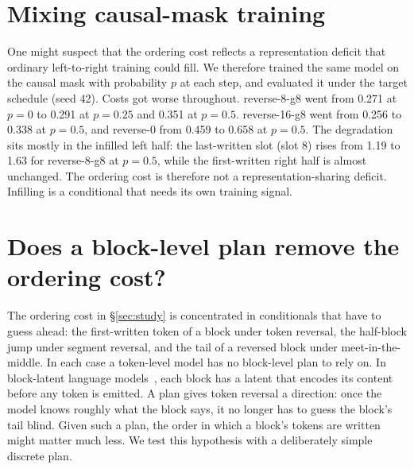 \documentclass[11pt]{article}
\theoremstyle{definition}
\theoremstyle{remark}
\newcommand{\sch}[1]{\textsf{#1}}
\begin{document}
\section{Mixing causal-mask training}
\label{app:mixing}

One might suspect that the ordering cost reflects a representation deficit that ordinary left-to-right training could fill.
We therefore trained the same model on the causal mask with probability $p$ at each step, and evaluated it under the target schedule (seed 42).
Costs got worse throughout.
\sch{reverse-8-g8} went from 0.271 at $p=0$ to 0.291 at $p=0.25$ and 0.351 at $p=0.5$.
\sch{reverse-16-g8} went from 0.256 to 0.338 at $p=0.5$, and \sch{reverse-0} from 0.459 to 0.658 at $p=0.5$.
The degradation sits mostly in the infilled left half: the last-written slot (slot 8) rises from 1.19 to 1.63 for \sch{reverse-8-g8} at $p=0.5$, while the first-written right half is almost unchanged.
The ordering cost is therefore not a representation-sharing deficit.
Infilling is a conditional that needs its own training signal.

\section{Does a block-level plan remove the ordering cost?}
\label{sec:latent}

The ordering cost in \S\ref{sec:study} is concentrated in conditionals that have to guess ahead: the first-written token of a block under token reversal, the half-block jump under segment reversal, and the tail of a reversed block under meet-in-the-middle.
In each case a token-level model has no block-level plan to rely on.
In block-latent language models~\citep{shao2025calm,he2026psf,li2026lclm}, each block has a latent that encodes its content before any token is emitted.
A plan gives token reversal a direction: once the model knows roughly what the block says, it no longer has to guess the block's tail blind.
Given such a plan, the order in which a block's tokens are written might matter much less.
We test this hypothesis with a deliberately simple discrete plan.
\end{document}
